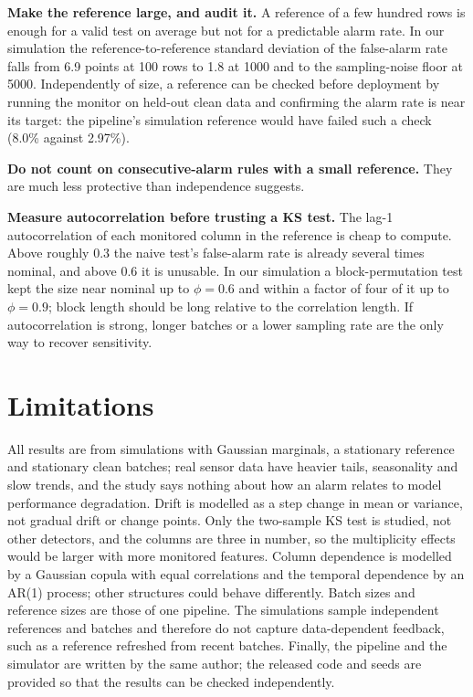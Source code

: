 \documentclass[11pt]{article}
\begin{document}
\textbf{Make the reference large, and audit it.} A reference of a few hundred rows is enough for a valid test on average but not for a predictable alarm rate. In our simulation the reference-to-reference standard deviation of the false-alarm rate falls from 6.9 points at 100 rows to 1.8 at 1000 and to the sampling-noise floor at 5000. Independently of size, a reference can be checked before deployment by running the monitor on held-out clean data and confirming the alarm rate is near its target: the pipeline's simulation reference would have failed such a check (8.0\% against 2.97\%).

\textbf{Do not count on consecutive-alarm rules with a small reference.} They are much less protective than independence suggests.

\textbf{Measure autocorrelation before trusting a KS test.} The lag-1 autocorrelation of each monitored column in the reference is cheap to compute. Above roughly $0.3$ the naive test's false-alarm rate is already several times nominal, and above $0.6$ it is unusable. In our simulation a block-permutation test kept the size near nominal up to $\phi=0.6$ and within a factor of four of it up to $\phi=0.9$; block length should be long relative to the correlation length. If autocorrelation is strong, longer batches or a lower sampling rate are the only way to recover sensitivity.

\section{Limitations}

All results are from simulations with Gaussian marginals, a stationary reference and stationary clean batches; real sensor data have heavier tails, seasonality and slow trends, and the study says nothing about how an alarm relates to model performance degradation. Drift is modelled as a step change in mean or variance, not gradual drift or change points. Only the two-sample KS test is studied, not other detectors, and the columns are three in number, so the multiplicity effects would be larger with more monitored features. Column dependence is modelled by a Gaussian copula with equal correlations and the temporal dependence by an AR(1) process; other structures could behave differently. Batch sizes and reference sizes are those of one pipeline. The simulations sample independent references and batches and therefore do not capture data-dependent feedback, such as a reference refreshed from recent batches. Finally, the pipeline and the simulator are written by the same author; the released code and seeds are provided so that the results can be checked independently.
\end{document}
